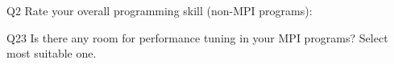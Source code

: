 \begin{description}%
\item{Q2} Rate your overall programming skill (non-MPI programs):%
\item{Q23} Is there any room for performance tuning in your MPI programs? Select most suitable one.%
\end{description}%
